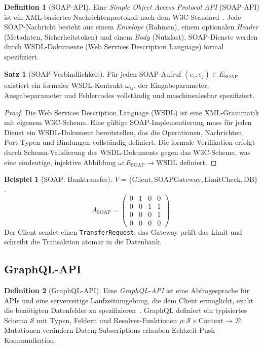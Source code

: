 ﻿\documentclass[a4paper,12pt]{article}
\theoremstyle{definition}
\newtheorem{definition}{Definition}
\newtheorem{beispiel}{Beispiel}
\newtheorem{satz}{Satz}
\begin{document}
\begin{definition}[SOAP-API]
  Eine \emph{Simple Object Access Protocol API} (SOAP-API) ist ein
  XML-basiertes Nachrichtenprotokoll nach dem W3C-Standard~\cite{w3c2007}.
  Jede SOAP-Nachricht besteht aus einem \emph{Envelope} (Rahmen), einem
  optionalen \emph{Header} (Metadaten, Sicherheitstoken) und einem
  \emph{Body} (Nutzlast). SOAP-Dienste werden durch WSDL-Dokumente
  (Web Services Description Language) formal spezifiziert.
\end{definition}

\begin{satz}[SOAP-Verbindlichkeit]
  Für jeden SOAP-Aufruf $(e_i, e_j) \in E_{\mathrm{SOAP}}$ existiert ein
  formaler WSDL-Kontrakt $\omega_{ij}$, der Eingabeparameter, Ausgabeparameter
  und Fehlercodes vollständig und maschinenlesbar spezifiziert.
\end{satz}

\begin{proof}
  Die Web Services Description Language (WSDL) ist eine XML-Grammatik mit
  eigenem W3C-Schema. Eine gültige SOAP-Implementierung muss für jeden
  Dienst ein WSDL-Dokument bereitstellen, das die Operationen, Nachrichten,
  Port-Typen und Bindungen vollständig definiert. Die formale Verifikation
  erfolgt durch Schema-Validierung des WSDL-Dokuments gegen das W3C-Schema,
  was eine eindeutige, injektive Abbildung
  $\omega: E_{\mathrm{SOAP}} \to \mathrm{WSDL}$ definiert.
\end{proof}

\begin{beispiel}[SOAP: Banktransfer]
  $V = \{\mathrm{Client}, \mathrm{SOAPGateway}, \mathrm{LimitCheck}, \mathrm{DB}\}$.
  \[
    A_{\mathrm{SOAP}} = \begin{pmatrix}
      0 & 1 & 0 & 0 \\
      0 & 0 & 1 & 1 \\
      0 & 0 & 0 & 1 \\
      0 & 0 & 0 & 0
    \end{pmatrix}.
  \]
  Der Client sendet einen \texttt{TransferRequest}; das Gateway prüft das Limit
  und schreibt die Transaktion atomar in die Datenbank.
\end{beispiel}

\subsection{GraphQL-API}

\begin{definition}[GraphQL-API]
  Eine \emph{GraphQL-API} ist eine Abfragesprache für APIs und eine serverseitige
  Laufzeitumgebung, die dem Client ermöglicht, exakt die benötigten Datenfelder
  zu spezifizieren~\cite{graphql2015}. GraphQL definiert ein typisiertes Schema
  $\mathcal{S}$ mit Typen, Feldern und Resolver-Funktionen
  $\rho: \mathcal{S} \times \mathrm{Context} \to \mathcal{D}$.
  Mutationen verändern Daten; Subscriptions erlauben Echtzeit-Push-Kommunikation.
\end{definition}
\end{document}
